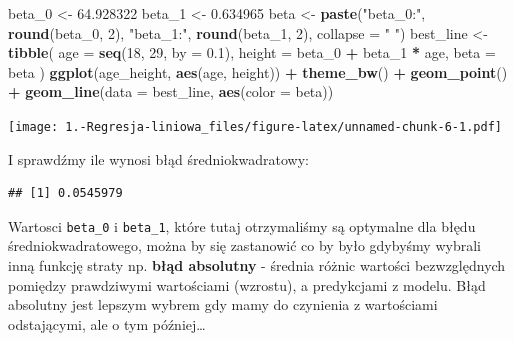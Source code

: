 \documentclass[
]{article}
\newenvironment{Shaded}{\begin{snugshade}}{\end{snugshade}}
\newcommand{\DataTypeTok}[1]{\textcolor[rgb]{0.13,0.29,0.53}{#1}}
\newcommand{\DecValTok}[1]{\textcolor[rgb]{0.00,0.00,0.81}{#1}}
\newcommand{\FloatTok}[1]{\textcolor[rgb]{0.00,0.00,0.81}{#1}}
\newcommand{\KeywordTok}[1]{\textcolor[rgb]{0.13,0.29,0.53}{\textbf{#1}}}
\newcommand{\NormalTok}[1]{#1}
\newcommand{\OperatorTok}[1]{\textcolor[rgb]{0.81,0.36,0.00}{\textbf{#1}}}
\newcommand{\StringTok}[1]{\textcolor[rgb]{0.31,0.60,0.02}{#1}}
\begin{document}
\begin{Shaded}
\begin{Highlighting}[]
\NormalTok{beta\_}\DecValTok{0}\NormalTok{ \textless{}{-}}\StringTok{ }\FloatTok{64.928322}
\NormalTok{beta\_}\DecValTok{1}\NormalTok{ \textless{}{-}}\StringTok{ }\FloatTok{0.634965}
\NormalTok{beta \textless{}{-}}\StringTok{ }\KeywordTok{paste}\NormalTok{(}\StringTok{"beta\_0:"}\NormalTok{, }\KeywordTok{round}\NormalTok{(beta\_}\DecValTok{0}\NormalTok{, }\DecValTok{2}\NormalTok{), }\StringTok{"beta\_1:"}\NormalTok{, }\KeywordTok{round}\NormalTok{(beta\_}\DecValTok{1}\NormalTok{, }\DecValTok{2}\NormalTok{), }\DataTypeTok{collapse =} \StringTok{" "}\NormalTok{)}
\NormalTok{best\_line \textless{}{-}}\StringTok{  }\KeywordTok{tibble}\NormalTok{(}
  \DataTypeTok{age =} \KeywordTok{seq}\NormalTok{(}\DecValTok{18}\NormalTok{, }\DecValTok{29}\NormalTok{, }\DataTypeTok{by =} \FloatTok{0.1}\NormalTok{),}
  \DataTypeTok{height =}\NormalTok{ beta\_}\DecValTok{0} \OperatorTok{+}\StringTok{ }\NormalTok{beta\_}\DecValTok{1} \OperatorTok{*}\StringTok{ }\NormalTok{age,}
  \DataTypeTok{beta =}\NormalTok{ beta}
\NormalTok{)}
\KeywordTok{ggplot}\NormalTok{(age\_height, }\KeywordTok{aes}\NormalTok{(age, height)) }\OperatorTok{+}\StringTok{ }\KeywordTok{theme\_bw}\NormalTok{() }\OperatorTok{+}\StringTok{ }\KeywordTok{geom\_point}\NormalTok{() }\OperatorTok{+}
\StringTok{  }\KeywordTok{geom\_line}\NormalTok{(}\DataTypeTok{data =}\NormalTok{ best\_line, }\KeywordTok{aes}\NormalTok{(}\DataTypeTok{color =}\NormalTok{ beta))}
\end{Highlighting}
\end{Shaded}

\texttt{[image: 1.-Regresja-liniowa\_files/figure-latex/unnamed-chunk-6-1.pdf]}

I sprawdźmy ile wynosi błąd średniokwadratowy:

\begin{Shaded}
\end{Shaded}

\begin{verbatim}
## [1] 0.0545979
\end{verbatim}

Wartosci \texttt{beta\_0} i \texttt{beta\_1}, które tutaj otrzymaliśmy
są optymalne dla błędu średniokwadratowego, można by się zastanowić co
by było gdybyśmy wybrali inną funkcję straty np. \textbf{błąd absolutny}
- średnia różnic wartości bezwzględnych pomiędzy prawdziwymi wartościami
(wzrostu), a predykcjami z modelu. Błąd absolutny jest lepszym wybrem
gdy mamy do czynienia z wartościami odstającymi, ale o tym
później\ldots{}
\end{document}
